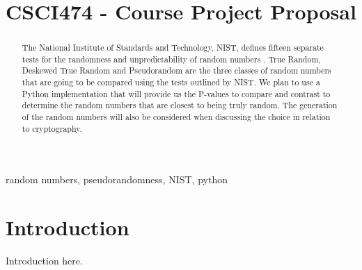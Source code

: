 \documentclass[11pt,letterpaper,conference]{IEEEtran}
\begin{document}
\title{CSCI474 - Course Project Proposal}

\author{
\and
{}
\and
{}
\and
{}
\and
{}
\and
{}
}

\maketitle

\begin{abstract}
The National Institute of Standards and Technology, NIST, defines fifteen separate tests
for the randomness and unpredictability of random numbers \cite{nistbook}. True Random, Deskewed True
Random and Pseudorandom are the three classes of random numbers that are going to be
compared using the tests outlined by NIST. We plan to use a Python implementation that will
provide us the P-values to compare and contrast to determine the random numbers that are
closest to being truly random. The generation of the random numbers will also be considered
when discussing the choice in relation to cryptography.
\end{abstract}

\begin{IEEEkeywords}
random numbers, pseudorandomness, NIST, python
\end{IEEEkeywords}

\section{Introduction}
Introduction here.
\end{document}
